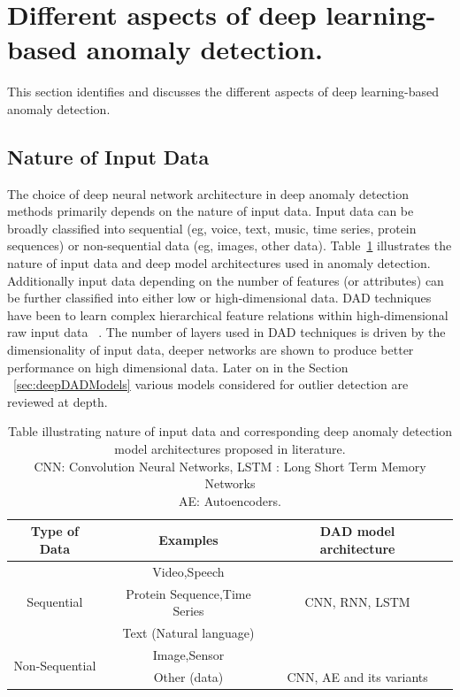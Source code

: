 \section{Different aspects of deep learning-based anomaly detection. }
\label{sec:aspectsOfAnomalyDetection}
This section identifies and discusses the different aspects of deep learning-based anomaly detection.

\subsection{ Nature of Input Data}
The choice of deep neural network architecture in deep anomaly detection methods primarily depends on the nature of input data. Input data can be broadly classified into sequential (eg, voice, text, music, time series, protein sequences) or non-sequential data (eg, images, other data). Table~\ref{tab:dataTypeModelArchitecture} illustrates the nature of input data and deep model architectures used in anomaly detection. Additionally input data depending on the number of features (or attributes) can be further classified into either low or high-dimensional data. DAD techniques have been to learn complex hierarchical feature relations within high-dimensional raw input data ~\cite{lecun2015deep}. The number of layers used in DAD techniques is driven by the dimensionality of input data, deeper networks are shown to produce better performance on high dimensional data. Later on in the Section ~\ref{sec:deepDADModels}  various models considered for outlier detection are reviewed at depth.

\begin{table}
\centering
\begin{tabular}{ |c|c|c|c| }
\hline
Type of Data & Examples & DAD model architecture  \\ [0.5ex]
\hline
\multirow{3}{3em}{Sequential} & Video,Speech &  \\
&Protein Sequence,Time Series  & CNN, RNN, LSTM  \\
&Text (Natural language)  &  \\
\hline
\multirow{2}{3em}{Non-Sequential} & Image,Sensor &  \\
&Other (data)  & CNN, AE and its variants  \\
\hline
\end{tabular}
\caption{Table illustrating nature of input data and corresponding deep anomaly detection model architectures proposed in literature.
        \\CNN: Convolution Neural Networks, LSTM : Long Short Term Memory Networks \\
         AE: Autoencoders. }
\label{tab:dataTypeModelArchitecture}
\end{table}


